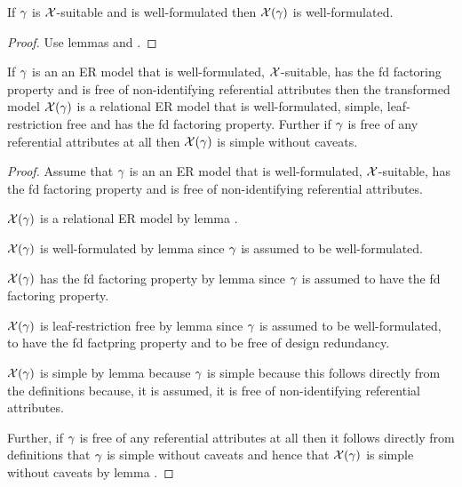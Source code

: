 \begin{lemma}
If  $\gamma$ is $\mathcal{X}$-suitable and is well-formulated then  $\mathcal{X}(\gamma)$ is well-formulated. 
\end{lemma}
\begin{proof}
Use lemmas  and .
\end{proof}

\begin{lemma}
If  $\gamma$ is an an ER model that is well-formulated,  $\mathcal{X}$-suitable, has the fd factoring property 
and is free of non-identifying referential attributes
then the transformed model $\mathcal{X}(\gamma)$ is a  relational ER model that is well-formulated, simple, leaf-restriction free
and has the fd factoring property.   
Further if $\gamma$ is free of any referential attributes at all then  $\mathcal{X}(\gamma)$ is simple without caveats.
\end{lemma}
\begin{proof}
Assume that $\gamma$ is an an ER model that is well-formulated,  $\mathcal{X}$-suitable, has the fd factoring property and
is free of non-identifying referential attributes. 

$\mathcal{X}(\gamma)$ is a  relational ER model by lemma .

$\mathcal{X}(\gamma)$ is well-formulated by lemma  since $\gamma$ is assumed to be well-formulated.

$\mathcal{X}(\gamma)$ has the fd factoring property by lemma   since $\gamma$ is assumed to have the fd factoring property.

$\mathcal{X}(\gamma)$ is leaf-restriction free by lemma   since $\gamma$ is assumed
to be  well-formulated, to have the fd factpring property and to be free of design redundancy.

$\mathcal{X}(\gamma)$ is simple by lemma  because $\gamma$ is simple because this follows directly from the definitions because, it is assumed, it is free of non-identifying referential attributes.

Further, if $\gamma$ is free of any referential attributes at all then it follows directly from definitions that $\gamma$ is simple without caveats
and hence  that $\mathcal{X}(\gamma)$ is simple without caveats by lemma .
\end{proof}

